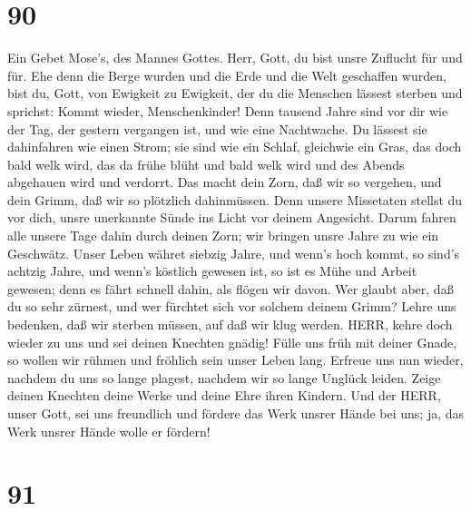 \hypertarget{section-89}{%
\section{90}\label{section-89}}

 Ein Gebet Mose's, des Mannes Gottes. Herr, Gott, du bist
unsre Zuflucht für und für.  Ehe denn die Berge wurden und
die Erde und die Welt geschaffen wurden, bist du, Gott, von Ewigkeit zu
Ewigkeit,  der du die Menschen lässest sterben und sprichst:
Kommt wieder, Menschenkinder!  Denn tausend Jahre sind vor
dir wie der Tag, der gestern vergangen ist, und wie eine Nachtwache.
 Du lässest sie dahinfahren wie einen Strom; sie sind wie
ein Schlaf, gleichwie ein Gras, das doch bald welk wird, 
das da frühe blüht und bald welk wird und des Abends abgehauen wird und
verdorrt.  Das macht dein Zorn, daß wir so vergehen, und
dein Grimm, daß wir so plötzlich dahinmüssen.  Denn unsere
Missetaten stellst du vor dich, unsre unerkannte Sünde ins Licht vor
deinem Angesicht.  Darum fahren alle unsere Tage dahin durch
deinen Zorn; wir bringen unsre Jahre zu wie ein Geschwätz. 
Unser Leben währet siebzig Jahre, und wenn's hoch kommt, so sind's
achtzig Jahre, und wenn's köstlich gewesen ist, so ist es Mühe und
Arbeit gewesen; denn es fährt schnell dahin, als flögen wir davon.
 Wer glaubt aber, daß du so sehr zürnest, und wer fürchtet
sich vor solchem deinem Grimm?  Lehre uns bedenken, daß wir
sterben müssen, auf daß wir klug werden.  HERR, kehre doch
wieder zu uns und sei deinen Knechten gnädig!  Fülle uns
früh mit deiner Gnade, so wollen wir rühmen und fröhlich sein unser
Leben lang.  Erfreue uns nun wieder, nachdem du uns so
lange plagest, nachdem wir so lange Unglück leiden.  Zeige
deinen Knechten deine Werke und deine Ehre ihren Kindern. 
Und der HERR, unser Gott, sei uns freundlich und fördere das Werk unsrer
Hände bei uns; ja, das Werk unsrer Hände wolle er fördern!

\hypertarget{section-90}{%
\section{91}\label{section-90}}

